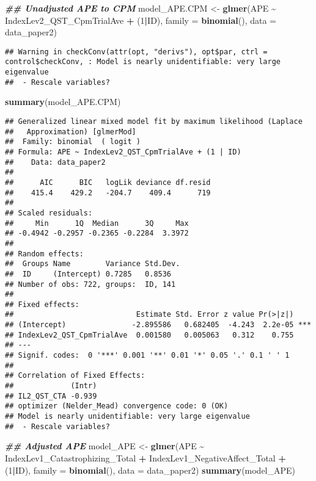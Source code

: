 \documentclass[
  12pt,
]{article}
\newenvironment{Shaded}{\begin{snugshade}}{\end{snugshade}}
\newcommand{\AttributeTok}[1]{\textcolor[rgb]{0.13,0.29,0.53}{#1}}
\newcommand{\DecValTok}[1]{\textcolor[rgb]{0.00,0.00,0.81}{#1}}
\newcommand{\DocumentationTok}[1]{\textcolor[rgb]{0.56,0.35,0.01}{\textbf{\textit{#1}}}}
\newcommand{\FunctionTok}[1]{\textcolor[rgb]{0.13,0.29,0.53}{\textbf{#1}}}
\newcommand{\NormalTok}[1]{#1}
\newcommand{\OtherTok}[1]{\textcolor[rgb]{0.56,0.35,0.01}{#1}}
\newcommand{\SpecialCharTok}[1]{\textcolor[rgb]{0.81,0.36,0.00}{\textbf{#1}}}
\begin{document}
\begin{Shaded}
\begin{Highlighting}[]
\DocumentationTok{\#\# Unadjusted APE to CPM}
\NormalTok{model\_APE.CPM }\OtherTok{\textless{}{-}} \FunctionTok{glmer}\NormalTok{(APE }\SpecialCharTok{\textasciitilde{}}\NormalTok{ IndexLev2\_QST\_CpmTrialAve }\SpecialCharTok{+}\NormalTok{ (}\DecValTok{1}\SpecialCharTok{|}\NormalTok{ID), }\AttributeTok{family =} \FunctionTok{binomial}\NormalTok{(), }\AttributeTok{data =}\NormalTok{ data\_paper2)}
\end{Highlighting}
\end{Shaded}

\begin{verbatim}
## Warning in checkConv(attr(opt, "derivs"), opt$par, ctrl = control$checkConv, : Model is nearly unidentifiable: very large eigenvalue
##  - Rescale variables?
\end{verbatim}

\begin{Shaded}
\begin{Highlighting}[]
\FunctionTok{summary}\NormalTok{(model\_APE.CPM)}
\end{Highlighting}
\end{Shaded}

\begin{verbatim}
## Generalized linear mixed model fit by maximum likelihood (Laplace
##   Approximation) [glmerMod]
##  Family: binomial  ( logit )
## Formula: APE ~ IndexLev2_QST_CpmTrialAve + (1 | ID)
##    Data: data_paper2
## 
##      AIC      BIC   logLik deviance df.resid 
##    415.4    429.2   -204.7    409.4      719 
## 
## Scaled residuals: 
##     Min      1Q  Median      3Q     Max 
## -0.4942 -0.2957 -0.2365 -0.2284  3.3972 
## 
## Random effects:
##  Groups Name        Variance Std.Dev.
##  ID     (Intercept) 0.7285   0.8536  
## Number of obs: 722, groups:  ID, 141
## 
## Fixed effects:
##                            Estimate Std. Error z value Pr(>|z|)    
## (Intercept)               -2.895586   0.682405  -4.243  2.2e-05 ***
## IndexLev2_QST_CpmTrialAve  0.001580   0.005063   0.312    0.755    
## ---
## Signif. codes:  0 '***' 0.001 '**' 0.01 '*' 0.05 '.' 0.1 ' ' 1
## 
## Correlation of Fixed Effects:
##             (Intr)
## IL2_QST_CTA -0.939
## optimizer (Nelder_Mead) convergence code: 0 (OK)
## Model is nearly unidentifiable: very large eigenvalue
##  - Rescale variables?
\end{verbatim}

\begin{Shaded}
\begin{Highlighting}[]
\DocumentationTok{\#\# Adjusted APE}
\NormalTok{model\_APE }\OtherTok{\textless{}{-}} \FunctionTok{glmer}\NormalTok{(APE }\SpecialCharTok{\textasciitilde{}}\NormalTok{ IndexLev1\_Catastrophizing\_Total }\SpecialCharTok{+}\NormalTok{ IndexLev1\_NegativeAffect\_Total }\SpecialCharTok{+}\NormalTok{ (}\DecValTok{1}\SpecialCharTok{|}\NormalTok{ID), }\AttributeTok{family =} \FunctionTok{binomial}\NormalTok{(), }\AttributeTok{data =}\NormalTok{ data\_paper2)}
\FunctionTok{summary}\NormalTok{(model\_APE)}
\end{Highlighting}
\end{Shaded}
\end{document}
